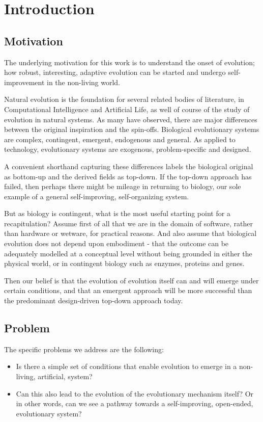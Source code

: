 \documentclass[]{report}
\begin{document}
\chapter{Introduction}

\section{Motivation}
The underlying motivation for this work is to understand the onset of evolution; how robust, interesting, adaptive evolution can be started and undergo self-improvement in the non-living world.

Natural evolution is the foundation for several related bodies of literature, in Computational Intelligence and Artificial Life, as well of course of the study of evolution in natural systems. As many have observed, there are major differences between the original inspiration and the spin-offs. Biological evolutionary systems are complex, contingent, emergent, endogenous and general. As applied to technology, evolutionary systems are exogenous, problem-specific and designed.

A convenient shorthand capturing these differences labels the biological original as bottom-up and the derived fields as top-down. If the top-down approach has failed, then perhaps there might be mileage in returning to biology, our sole example of a general self-improving, self-organizing system.

But as biology is contingent, what is the most useful starting point for a recapitulation? Assume first of all that we are in the domain of software, rather than hardware or wetware, for practical reasons. And also assume that biological evolution does not depend upon embodiment - that the outcome can be adequately modelled at a conceptual level without being grounded in either the physical world, or in contingent biology such as enzymes, proteins and genes.

Then our belief is that the evolution of evolution itself can and will emerge under certain conditions, and that an emergent approach will be more successful than the predominant design-driven top-down approach today.

\section{Problem}
The specific problems we address are the following:
\begin{itemize}
	\item Is there a simple set of conditions that enable evolution to emerge in a non-living, artificial, system?
	\item Can this also lead to the evolution of the evolutionary mechanism itself? Or in other words, can we see a pathway towards a self-improving, open-ended, evolutionary system?
\end{itemize}
\end{document}
